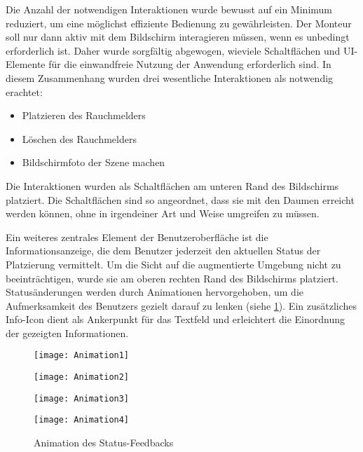 Die Anzahl der notwendigen Interaktionen wurde bewusst auf ein Minimum reduziert, um eine möglichst effiziente Bedienung zu gewährleisten. Der Monteur soll nur dann aktiv mit dem Bildschirm interagieren müssen, wenn es unbedingt erforderlich ist. Daher wurde sorgfältig abgewogen, wieviele Schaltflächen und UI-Elemente für die einwandfreie Nutzung der Anwendung erforderlich sind. In diesem Zusammenhang wurden drei wesentliche Interaktionen als notwendig erachtet:

\begin{itemize}
    \item Platzieren des Rauchmelders
    \item Löschen des Rauchmelders
    \item Bildschirmfoto der Szene machen
\end{itemize}

Die Interaktionen wurden als Schaltflächen am unteren Rand des Bildschirms platziert. Die Schaltflächen sind so angeordnet, dass sie mit den Daumen erreicht werden können, ohne in irgendeiner Art und Weise umgreifen zu müssen. 

Ein weiteres zentrales Element der Benutzeroberfläche ist die Informationsanzeige, die dem Benutzer jederzeit den aktuellen Status der Platzierung vermittelt. Um die Sicht auf die augmentierte Umgebung nicht zu beeinträchtigen, wurde sie am oberen rechten Rand des Bildschirms platziert. Statusänderungen werden durch Animationen hervorgehoben, um die Aufmerksamkeit des Benutzers gezielt darauf zu lenken (siehe \ref{fig:Animation}). Ein zusätzliches Info-Icon dient als Ankerpunkt für das Textfeld und erleichtert die Einordnung der gezeigten Informationen.

\begin{figure}[ht]
    \centering
    \begin{minipage}{\textwidth}
        \begin{minipage}{0.45\textwidth}
            \centering
            \texttt{[image: Animation1]}
        \end{minipage}
        \begin{minipage}{0.45\textwidth}
            \centering
            \texttt{[image: Animation2]}
        \end{minipage}
    \end{minipage}
    \begin{minipage}{\textwidth}
        \begin{minipage}{0.45\textwidth}
            \centering
            \texttt{[image: Animation3]}
        \end{minipage}
        \begin{minipage}{0.45\textwidth}
            \centering
            \texttt{[image: Animation4]}
        \end{minipage}
    \end{minipage}
    \caption{Animation des Status-Feedbacks}
    \label{fig:Animation}
\end{figure}


